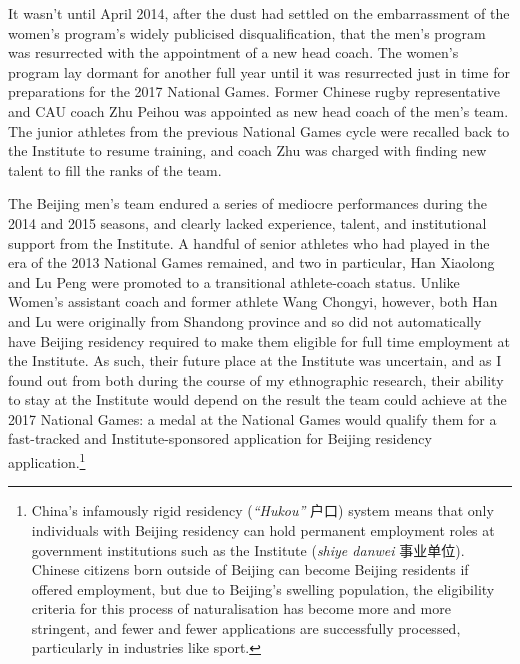 \begin{CJK}{UTF8}{gbsn}
 It wasn't until April 2014, after the dust had settled on the embarrassment of the women's program's widely publicised disqualification, that the men's program was resurrected with the appointment of a new head coach.  The women's program lay dormant for another full year until it was resurrected just in time for preparations for the 2017 National Games. Former Chinese rugby  representative and CAU coach Zhu Peihou was appointed as new head coach of the men's team.  The junior athletes from the previous National Games cycle were recalled back to the Institute to resume training, and coach Zhu was charged with finding new talent to fill the ranks of the team.

 The Beijing men's team endured a series of mediocre performances during the 2014 and 2015 seasons, and clearly lacked experience, talent, and institutional support from the Institute.  A handful of senior athletes who had played in the era of the 2013 National Games remained, and two in particular, Han Xiaolong and Lu Peng were promoted to a transitional athlete-coach status. Unlike Women's assistant coach and former athlete Wang Chongyi, however, both Han and Lu were originally from Shandong province and so did not automatically have Beijing residency required to make them eligible for full time employment at the Institute.  As such, their future place at the Institute was uncertain, and as I found out from both during the course of my ethnographic research, their ability to stay at the Institute would depend on the result the team could achieve at the 2017 National Games: a medal at the National Games would qualify them for a fast-tracked and Institute-sponsored application for Beijing residency application.\footnote{China's infamously rigid residency (\textit{``Hukou''} 户口) system means that only individuals with Beijing residency can hold permanent employment roles at government institutions such as the Institute (\textit{shiye danwei} 事业单位).  Chinese citizens born outside of Beijing can become Beijing residents if offered employment, but due to Beijing's swelling population, the eligibility criteria for this process of naturalisation has become more and more stringent, and fewer and fewer applications are successfully processed, particularly in industries like sport.}


\end{CJK}
